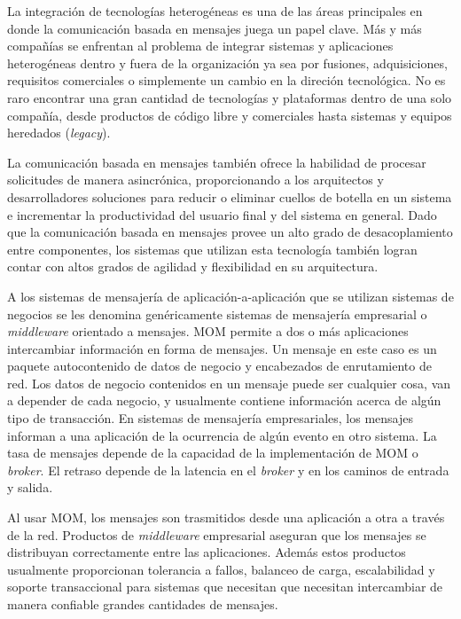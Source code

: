 \documentclass[article]{IEEEtran}
\begin{document}
La integración de tecnologías heterogéneas es una de las áreas principales en donde la comunicación basada en mensajes juega un papel clave. Más y más compañías se enfrentan al problema de integrar sistemas y aplicaciones heterogéneas dentro y fuera de la organización ya sea por fusiones, adquisiciones, requisitos comerciales o simplemente un cambio en la direción tecnológica. No es raro encontrar una gran cantidad de tecnologías y plataformas dentro de una solo compañía, desde productos de código libre y comerciales hasta sistemas y equipos heredados (\emph{legacy}).

La comunicación basada en mensajes también ofrece la habilidad de procesar solicitudes de manera asincrónica, proporcionando a los arquitectos y desarrolladores soluciones para reducir o eliminar cuellos de botella en un sistema e incrementar la productividad del usuario final y del sistema en general. Dado que la comunicación basada en mensajes provee un alto grado de desacoplamiento entre componentes, los sistemas que utilizan esta tecnología también logran contar con altos grados de agilidad y flexibilidad en su arquitectura.

A los sistemas de mensajería de aplicación-a-aplicación que se utilizan sistemas de negocios se les denomina genéricamente sistemas de mensajería empresarial o \emph{middleware} orientado a mensajes\cite{jms20}. MOM permite a dos o más aplicaciones intercambiar información en forma de mensajes. Un mensaje en este caso es un paquete autocontenido de datos de negocio y encabezados de enrutamiento de red. Los datos de negocio contenidos en un mensaje puede ser cualquier cosa, van a depender de cada negocio, y usualmente contiene información acerca de algún tipo de transacción. En sistemas de mensajería empresariales, los mensajes informan a una aplicación de la ocurrencia de algún evento en otro sistema. La tasa de mensajes depende de la capacidad de la implementación de MOM o \emph{broker}. El retraso depende de la latencia en el \emph{broker} y en los caminos de entrada y salida\cite{chew}.

Al usar MOM, los mensajes son trasmitidos desde una aplicación a otra a través de la red. Productos de \emph{middleware} empresarial aseguran que los mensajes se distribuyan correctamente entre las aplicaciones. Además estos productos usualmente proporcionan tolerancia a fallos, balanceo de carga, escalabilidad y soporte transaccional para sistemas que necesitan que necesitan intercambiar de manera confiable grandes cantidades de mensajes.
\end{document}
